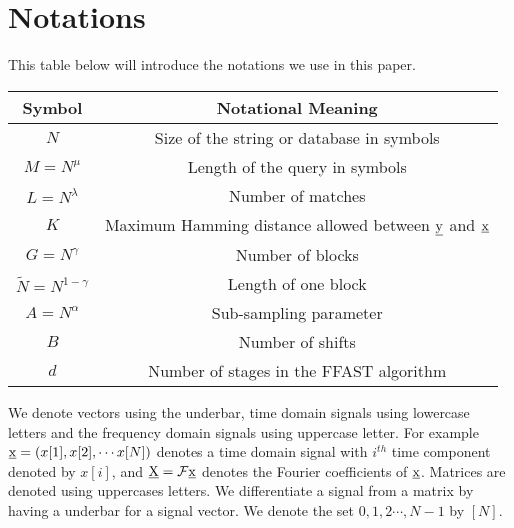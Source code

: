 \section{Notations}

This table below will introduce the notations we use in this paper.

\begin{center}
	
	\begin{tabular}{|c|c|}
		
		\hline
		
		Symbol     &  Notational Meaning \\
		
		\hline
		
		$N$           & Size of the string or database in symbols \\
		\hline
		$M = N^{\mu}$           & Length of the query in symbols \\
		\hline
        $L = N^\lambda$  &   Number of matches \\
        \hline
        $K$             & Maximum Hamming distance allowed between $\underline{\mathrm{y}}$ and $\underline{\mathrm{x}}$ \\
        \hline
		$G = N^\gamma$           & Number of blocks \\
		\hline
		$\tilde{N} = N^{1-\gamma}$   & Length of one block \\
		\hline
		$A = N^\alpha$      & Sub-sampling parameter \\
		\hline
		$B$       & Number of shifts  \\
		\hline
		$d$           & Number of stages in the FFAST algorithm \\
		\hline
	\end{tabular}
\end{center}	
	
	\vspace{15pt}


We denote vectors using the underbar, time domain signals using lowercase letters and the frequency domain signals using uppercase letter. For example $\underline{\mathrm{x}} = (x[1],x[2], \cdots x[N] )$ denotes a time domain signal with $i^{th}$ time component denoted by $x[i]$, and $\underline{\mathrm{X}}= \mathcal{F}\underline{\mathrm{x}}$ denotes the Fourier coefficients of $\underline{\mathrm{x}}$. Matrices are denoted using uppercases letters. We differentiate a signal from a matrix by having a underbar for a signal vector. We denote the set ${0,1,2\cdots, N-1}$ by $[N]$.
	
	

